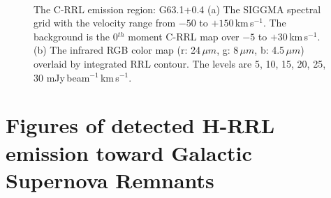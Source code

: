 \documentclass[manuscript]{aastex61}
\newcommand{\kms}{\,km\,s$^{-1}$}
\newcommand{\um}{\mu m}
\begin{document}
\begin{figure}[H]
	\centering
	\\ 
	\caption{The C-RRL emission region: G63.1+0.4
	(a) The SIGGMA spectral grid with the velocity range from $-50$ to $+150$\kms.
	The background is the 0$^{th}$ moment C-RRL map over $-5$ to $+30$\kms.
	(b) The infrared RGB color map (r: 24\,$\um$, g: 8\,$\um$, b: 4.5\,$\um$) overlaid by integrated RRL contour.
	The levels are 5, 10, 15, 20, 25, 30 mJy\,beam$^{-1}$\kms.}
	\label{fig_crrl-g631}
\end{figure}

\newpage

\section{Figures of detected H-RRL emission toward Galactic Supernova Remnants}\label{appe:snr}
\end{document}
